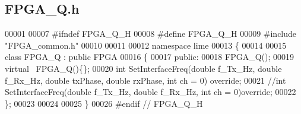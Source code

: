 \subsection{F\+P\+G\+A\+\_\+\+Q.\+h}
\label{FPGA__Q_8h_source}

\begin{DoxyCode}
00001 
00007 \textcolor{preprocessor}{#ifndef FPGA\_Q\_H}
00008 \textcolor{preprocessor}{#define FPGA\_Q\_H}
00009 \textcolor{preprocessor}{#include "FPGA_common.h"}
00010 
00011 
00012 \textcolor{keyword}{namespace }lime
00013 \{
00014     
00015 \textcolor{keyword}{class }FPGA_Q : \textcolor{keyword}{public} FPGA
00016 \{
00017 \textcolor{keyword}{public}:  
00018     FPGA_Q();
00019     \textcolor{keyword}{virtual} ~FPGA_Q()\{\};
00020     \textcolor{keywordtype}{int} SetInterfaceFreq(\textcolor{keywordtype}{double} f\_Tx\_Hz, \textcolor{keywordtype}{double} f\_Rx\_Hz, \textcolor{keywordtype}{double} txPhase, \textcolor{keywordtype}{double} rxPhase, \textcolor{keywordtype}{int} ch = 0)\textcolor{keyword}{
      override};
00021     \textcolor{comment}{//int SetInterfaceFreq(double f\_Tx\_Hz, double f\_Rx\_Hz, int ch = 0)override;}
00022 \};
00023 
00024 
00025 \}
00026 \textcolor{preprocessor}{#endif // FPGA\_Q\_H}
\end{DoxyCode}
